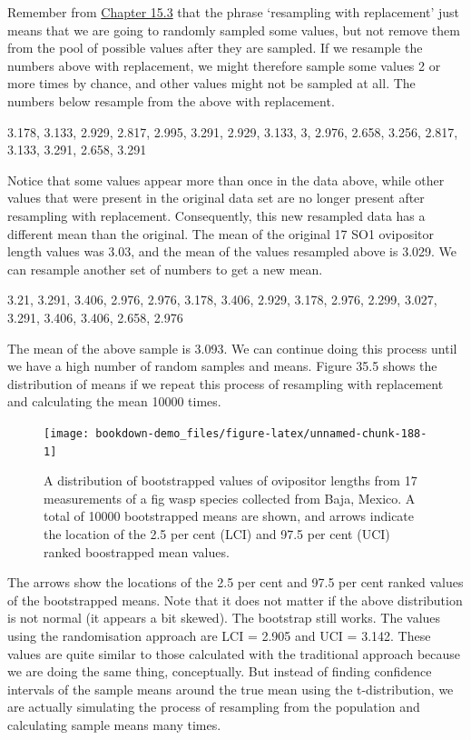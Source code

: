 \documentclass[
]{scrbook}
\begin{document}
Remember from \protect\hyperlink{sampling-with-and-without-replacement}{Chapter 15.3} that the phrase `resampling with replacement' just means that we are going to randomly sampled some values, but not remove them from the pool of possible values after they are sampled.
If we resample the numbers above with replacement, we might therefore sample some values 2 or more times by chance, and other values might not be sampled at all.
The numbers below resample from the above with replacement.

3.178, 3.133, 2.929, 2.817, 2.995, 3.291, 2.929, 3.133, 3, 2.976, 2.658, 3.256, 2.817, 3.133, 3.291, 2.658, 3.291

Notice that some values appear more than once in the data above, while other values that were present in the original data set are no longer present after resampling with replacement. Consequently, this new resampled data has a different mean than the original.
The mean of the original 17 SO1 ovipositor length values was 3.03, and the mean of the values resampled above is 3.029.
We can resample another set of numbers to get a new mean.

3.21, 3.291, 3.406, 2.976, 2.976, 3.178, 3.406, 2.929, 3.178, 2.976, 2.299, 3.027, 3.291, 3.406, 3.406, 2.658, 2.976

The mean of the above sample is 3.093.
We can continue doing this process until we have a high number of random samples and means. Figure 35.5 shows the distribution of means if we repeat this process of resampling with replacement and calculating the mean 10000 times.

\begin{figure}
\texttt{[image: bookdown-demo\_files/figure-latex/unnamed-chunk-188-1]} \caption{A distribution of bootstrapped values of ovipositor lengths from 17 measurements of a fig wasp species collected from Baja, Mexico. A total of 10000 bootstrapped means are shown, and arrows indicate the location of the 2.5 per cent (LCI) and 97.5 per cent (UCI) ranked boostrapped mean values.}\label{fig:unnamed-chunk-188}
\end{figure}

The arrows show the locations of the 2.5 per cent and 97.5 per cent ranked values of the bootstrapped means.
Note that it does not matter if the above distribution is not normal (it appears a bit skewed).
The bootstrap still works.
The values using the randomisation approach are LCI = 2.905 and UCI = 3.142.
These values are quite similar to those calculated with the traditional approach because we are doing the same thing, conceptually.
But instead of finding confidence intervals of the sample means around the true mean using the t-distribution, we are actually simulating the process of resampling from the population and calculating sample means many times.
\end{document}
